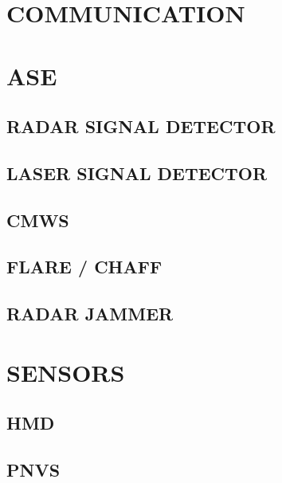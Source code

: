 \documentclass[fontHelvetica]{TechCheck}
\begin{document}
	\chapter{COMMUNICATION}
	\minitoc
	\cleardoublepage

	\chapter{ASE}
	\minitoc
	\cleardoublepage

	
	\section{RADAR SIGNAL DETECTOR}

	\clearpage 

	\section{LASER SIGNAL DETECTOR}

	\clearpage 

	\section{CMWS}

	\clearpage 

	\section{FLARE / CHAFF}

	\clearpage 

	\section{RADAR JAMMER}

	\cleardoublepage
	

	\chapter{SENSORS}
	\minitoc
	\cleardoublepage

	\section{HMD}

	\clearpage 

	\section{PNVS}
\end{document}
